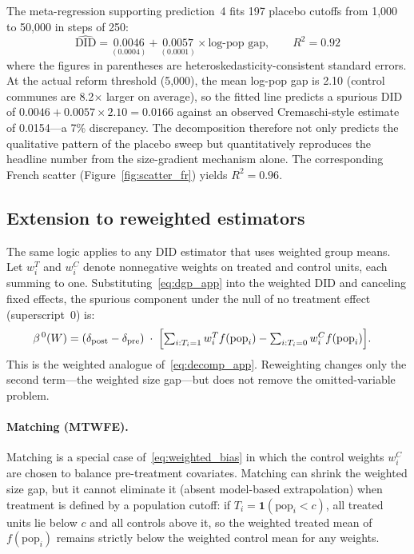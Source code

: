 \documentclass[12pt,letterpaper]{article}
\begin{document}
The meta-regression supporting prediction~4 fits 197 placebo cutoffs from 1,000 to 50,000 in steps of 250:
%
\begin{equation}
  \widehat{\text{DID}} = \underset{(0.0004)}{0.0046} + \underset{(0.0001)}{0.0057} \times \text{log-pop gap},
  \qquad R^2 = 0.92
  \label{eq:logpop}
\end{equation}
%
where the figures in parentheses are heteroskedasticity-consistent standard errors. At the actual reform threshold (5,000), the mean log-pop gap is 2.10 (control communes are 8.2$\times$ larger on average), so the fitted line predicts a spurious DID of $0.0046 + 0.0057 \times 2.10 = 0.0166$ against an observed Cremaschi-style estimate of 0.0154---a 7\% discrepancy. The decomposition therefore not only predicts the qualitative pattern of the placebo sweep but quantitatively reproduces the headline number from the size-gradient mechanism alone. The corresponding French scatter (Figure~\ref{fig:scatter_fr}) yields $R^2 = 0.96$.

\subsection{Extension to reweighted estimators}
\label{si:reweighted}

The same logic applies to any DID estimator that uses weighted group means. Let $w_i^T$ and $w_i^C$ denote nonnegative weights on treated and control units, each summing to one. Substituting~\eqref{eq:dgp_app} into the weighted DID and canceling fixed effects, the spurious component under the null of no treatment effect (superscript~$0$) is:
%
\begin{align}
  \beta^{\,0}(W)
  &= (\delta_{\text{post}} - \delta_{\text{pre}}) \;\cdot\;
     \Bigl[\textstyle\sum_{i:T_i=1} w_i^T f(\text{pop}_i) - \sum_{i:T_i=0} w_i^C f(\text{pop}_i)\Bigr].
  \label{eq:weighted_bias}
\end{align}
%
This is the weighted analogue of~\eqref{eq:decomp_app}. Reweighting changes only the second term---the weighted size gap---but does not remove the omitted-variable problem.

\paragraph{Matching (MTWFE).} Matching is a special case of~\eqref{eq:weighted_bias} in which the control weights $w_i^C$ are chosen to balance pre-treatment covariates. Matching can shrink the weighted size gap, but it cannot eliminate it (absent model-based extrapolation) when treatment is defined by a population cutoff: if $T_i = \mathbf{1}(\text{pop}_i < c)$, all treated units lie below $c$ and all controls above it, so the weighted treated mean of $f(\text{pop}_i)$ remains strictly below the weighted control mean for any weights.
\end{document}
